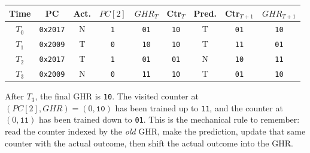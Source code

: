     {\small
\begin{center}
    \setlength{\tabcolsep}{4pt}
    \renewcommand{\arraystretch}{1.15}
    \begin{tabular}{|c|c|c|c|c|c|c|c|c|}
        \hline
        Time & PC & Act.
        & $PC[2]$ & $GHR_T$ & Ctr$_T$ & Pred.
        & Ctr$_{T+1}$ & $GHR_{T+1}$ \\
        \hline
        $T_0$ & \texttt{0x2017} & N & \texttt{1} & \texttt{01} & \texttt{10} & T & \texttt{01} & \texttt{10} \\
        \hline
        $T_1$ & \texttt{0x2009} & T & \texttt{0} & \texttt{10} & \texttt{10} & T & \texttt{11} & \texttt{01} \\
        \hline
        $T_2$ & \texttt{0x2017} & T & \texttt{1} & \texttt{01} & \texttt{01} & N & \texttt{10} & \texttt{11} \\
        \hline
        $T_3$ & \texttt{0x2009} & N & \texttt{0} & \texttt{11} & \texttt{10} & T & \texttt{01} & \texttt{10} \\
        \hline
    \end{tabular}
\end{center}}

After $T_3$, the final GHR is \texttt{10}.
The visited counter at $(PC[2],GHR)=(0,\texttt{10})$ has been trained up to \texttt{11}, and the counter at $(0,\texttt{11})$ has been trained down to \texttt{01}.
This is the mechanical rule to remember: read the counter indexed by the \emph{old} GHR, make the prediction, update that same counter with the actual outcome, then shift the actual outcome into the GHR\@.

